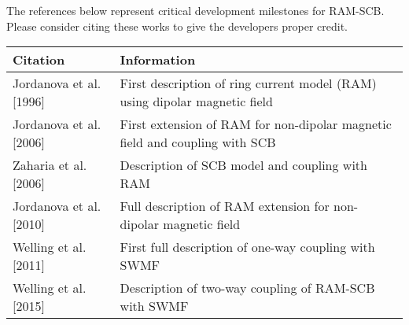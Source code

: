 The references below represent critical development milestones for RAM-SCB. Please consider citing
these works to give the developers proper credit.


\begin{table}[ht]
  \centering
  \begin{tabular}{l|l}
    Citation & Information \\
    \hline
    \hline
    Jordanova et al. [1996] & First description of ring current model (RAM) using dipolar magnetic field \\
    \hline
    Jordanova et al. [2006] & First extension of RAM for non-dipolar magnetic field and coupling with SCB \\
    \hline
    Zaharia et al. [2006] & Description of SCB model and coupling with RAM \\
    \hline
    Jordanova et al. [2010] & Full description of RAM extension for non-dipolar magnetic field \\
    \hline
    Welling et al. [2011] & First full description of one-way coupling with SWMF \\
    \hline
    Welling et al. [2015] & Description of two-way coupling of RAM-SCB
  with SWMF \\
    \hline
  \end{tabular}
\end{table}




